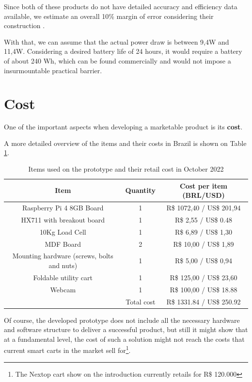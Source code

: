 \documentclass[openright]{normas-utf-tex} %
\begin{document}
Since both of these products do not have detailed accuracy and efficiency data
available, we estimate an overall 10\% margin of error considering their
construction \cite{Chen2017}. 

With that, we can assume that the actual power draw is between 9,4W and 11,4W.
Considering a desired  battery life of 24 hours, it would require a battery of
about 240 Wh, which can be found commercially and would not impose a
insurmountable practical barrier.

\section{Cost}

One of the important aspects when developing a marketable product is its \textbf{cost}.

A more detailed overview of the items and their costs in Brazil is shown on Table \ref{tbl:cost}.

\begin{table}[H]
	\centering
	\label{tab:correlacao}
	\begin{tabular}{c c c}
		\hline 
        Item & Quantity & Cost per item (BRL/USD) \\
		\hline
        Raspberry Pi 4 8GB Board &  1 & R\$ 1072,40 / US\$ 201,94 \\
        HX711 with breakout board &  1  & R\$ 2,55 / US\$ 0.48 \\
        10Kg Load Cell & 1 & R\$ 6,89 / US\$ 1,30 \\
        MDF Board &  2  & R\$ 10,00 / US\$ 1,89 \\
        Mounting hardware (screws, bolts and nuts) &  1  & R\$ 5,00 / US\$ 0,94 \\
        Foldable utility cart &  1  & R\$ 125,00 / US\$ 23,60 \\
        Webcam &  1  & R\$ 100,00 / US\$ 18.88 \\
		\hline 
        & Total cost & R\$ 1331.84 / US\$ 250.92 \\
        \hline
	\end{tabular}
    \caption[Items used on the prototype and their approximate retail cost in Brazil as of October 2022]{Items used on the prototype and their retail cost in October 2022}
    \label{tbl:cost}
\end{table}

Of course, the developed prototype does not include all the necessary hardware
and software structure to deliver a successful product, but still it might show that at a
fundamental level, the cost of such a solution might not reach the costs that
current smart carts in the market sell for\footnote{The Nextop cart show on the
introduction currently retails for R\$ 120.000}.
\end{document}

